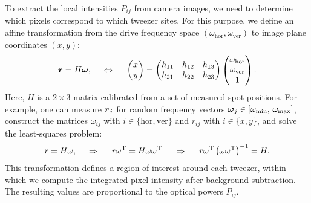 
To extract the local intensities $P_{ij}$ from camera images, we need to determine which pixels correspond to which tweezer sites. For this purpose, we define an affine transformation from the drive frequency space $(\omega_{\mathrm{hor}}, \omega_{\mathrm{ver}})$ to image plane coordinates $(x, y)$:
\begin{equation*}
    \boldsymbol{r} = H \boldsymbol{\omega},
    \hspace{5 mm} \Leftrightarrow \hspace{5 mm} 
    \begin{pmatrix}
        x \\ y
    \end{pmatrix} = \begin{pmatrix}
        h_{11} & h_{12} & h_{13} \\
        h_{21} & h_{22} & h_{23}
    \end{pmatrix} 
    \begin{pmatrix}
        \omega_{\textnormal{hor}} \\
        \omega_{\textnormal{ver}} \\
        1
    \end{pmatrix}.
\end{equation*}
Here, $H$ is a $2 \times 3$ matrix calibrated from a set of measured spot positions. For example, one can measure $\boldsymbol{r}_j$ for random frequency vectors $\boldsymbol{\omega}_j \in [\omega_{\mathrm{min}},\, \omega_{\mathrm{max}}]$, construct the matrices $\omega_{ij}$ with $i \in \{\mathrm{hor}, \mathrm{ver}\}$ and $r_{ij}$ with $i \in \{x, y\}$, and solve the least-squares problem:
\begin{equation}
    r = H \omega,
    \hspace{0.5cm} \Rightarrow \hspace{0.5cm}
    r \omega^\mathrm{T} = H \omega \omega^\mathrm{T}
    \hspace{0.5cm} \Rightarrow \hspace{0.5cm}
    r \omega^\mathrm{T} \left(\omega \omega^\mathrm{T}\right)^{-1} = H.
    \label{eq:linreg-freq2pos}
\end{equation}
This transformation defines a region of interest around each tweezer, within which we compute the integrated pixel intensity after background subtraction. The resulting values are proportional to the optical powers $P_{ij}$.

